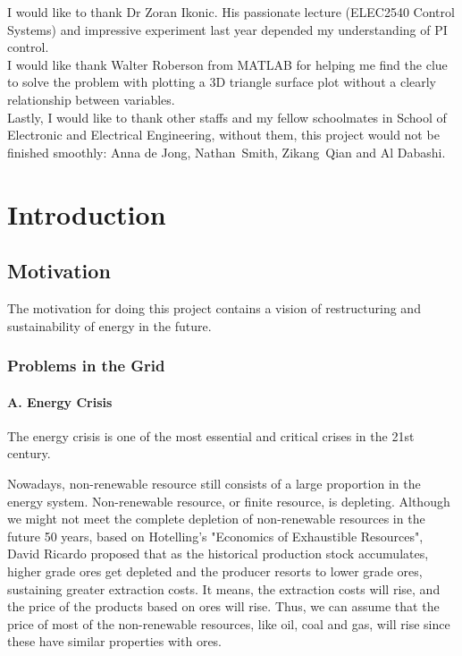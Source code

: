 \documentclass{report}
\begin{document}
I would like to thank Dr Zoran Ikonic. His passionate lecture (ELEC2540 Control Systems) and impressive experiment last year depended my understanding of PI control.\\

I would like thank Walter Roberson from MATLAB for helping me find the clue to solve the problem with plotting a 3D triangle surface plot without a clearly relationship between variables.\\

Lastly, I would like to thank other staffs and my fellow schoolmates in School of Electronic and Electrical Engineering, without them, this project would not be finished smoothly: Anna de Jong, Nathan Smith, Zikang Qian and Al Dabashi.\\



\afterpreface


\chapter{Introduction}
\section{Motivation} %
The motivation for doing this project contains a vision of restructuring and sustainability of energy in the future.
\subsection{Problems in the Grid}
\subsubsection{A. Energy Crisis}
The energy crisis is one of the most essential and critical crises in the 21st century.

Nowadays, non-renewable resource still consists of a large proportion in the energy system. Non-renewable resource, or finite resource, is depleting. Although we might not meet the complete depletion of non-renewable resources in the future 50 years, based on Hotelling’s "Economics of Exhaustible Resources", David Ricardo proposed that as the historical production stock accumulates, higher grade ores get depleted and the producer resorts to lower grade ores, sustaining greater extraction costs. It means, the extraction costs will rise, and the price of the products based on ores will rise. Thus, we can assume that the price of most of the non-renewable resources, like oil, coal and gas, will rise since these have similar properties with ores.\\
\end{document}
